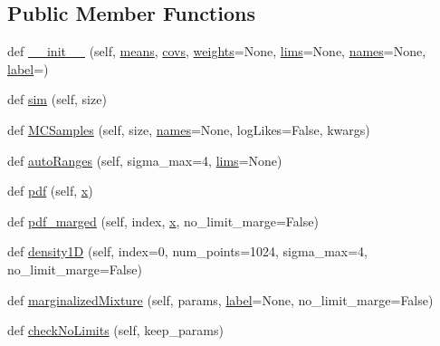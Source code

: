 \subsection*{Public Member Functions}
\begin{DoxyCompactItemize}
\item 
def \mbox{\hyperlink{classgetdist_1_1gaussian__mixtures_1_1MixtureND_ae08d46f0f7923a7dcb43eb540c8b9de6}{\+\_\+\+\_\+init\+\_\+\+\_\+}} (self, \mbox{\hyperlink{classgetdist_1_1gaussian__mixtures_1_1MixtureND_aeee57b3c06a515c91821b09866b52da3}{means}}, \mbox{\hyperlink{classgetdist_1_1gaussian__mixtures_1_1MixtureND_a51e91169ecb626b2ca59779abeed17b7}{covs}}, \mbox{\hyperlink{classgetdist_1_1gaussian__mixtures_1_1MixtureND_a7fbae73d771ec0e1ca1f80558ad3b08b}{weights}}=None, \mbox{\hyperlink{classgetdist_1_1gaussian__mixtures_1_1MixtureND_a0b9e4c4e0b3529e79cfa980507f8d2ea}{lims}}=None, \mbox{\hyperlink{classgetdist_1_1gaussian__mixtures_1_1MixtureND_ad26124d47b68d38fa8e90bc135769e6b}{names}}=None, \mbox{\hyperlink{classgetdist_1_1gaussian__mixtures_1_1MixtureND_aa9a7187396fe46246dc62e921c17302c}{label}}=\textquotesingle{}\textquotesingle{})
\item 
def \mbox{\hyperlink{classgetdist_1_1gaussian__mixtures_1_1MixtureND_a59cc8f909638f1b571279518b9285089}{sim}} (self, size)
\item 
def \mbox{\hyperlink{classgetdist_1_1gaussian__mixtures_1_1MixtureND_aa21545c325ae1162596655b4f4425acb}{M\+C\+Samples}} (self, size, \mbox{\hyperlink{classgetdist_1_1gaussian__mixtures_1_1MixtureND_ad26124d47b68d38fa8e90bc135769e6b}{names}}=None, log\+Likes=False, kwargs)
\item 
def \mbox{\hyperlink{classgetdist_1_1gaussian__mixtures_1_1MixtureND_aaa880a5a80583fb9f416e9fe9d99f25e}{auto\+Ranges}} (self, sigma\+\_\+max=4, \mbox{\hyperlink{classgetdist_1_1gaussian__mixtures_1_1MixtureND_a0b9e4c4e0b3529e79cfa980507f8d2ea}{lims}}=None)
\item 
def \mbox{\hyperlink{classgetdist_1_1gaussian__mixtures_1_1MixtureND_af0a646f4166c5e7183084e5fbea8b0b9}{pdf}} (self, \mbox{\hyperlink{plotTT_8m_a9336ebf25087d91c818ee6e9ec29f8c1}{x}})
\item 
def \mbox{\hyperlink{classgetdist_1_1gaussian__mixtures_1_1MixtureND_aa2ffcc1eb16586e772ea92dd662ba9e7}{pdf\+\_\+marged}} (self, index, \mbox{\hyperlink{plotTT_8m_a9336ebf25087d91c818ee6e9ec29f8c1}{x}}, no\+\_\+limit\+\_\+marge=False)
\item 
def \mbox{\hyperlink{classgetdist_1_1gaussian__mixtures_1_1MixtureND_a19dac60689b4c4e7772ffa807aad2dc0}{density1D}} (self, index=0, num\+\_\+points=1024, sigma\+\_\+max=4, no\+\_\+limit\+\_\+marge=False)
\item 
def \mbox{\hyperlink{classgetdist_1_1gaussian__mixtures_1_1MixtureND_a9336c58f7855163a171ea12a4d4bdbd1}{marginalized\+Mixture}} (self, params, \mbox{\hyperlink{classgetdist_1_1gaussian__mixtures_1_1MixtureND_aa9a7187396fe46246dc62e921c17302c}{label}}=None, no\+\_\+limit\+\_\+marge=False)
\item 
def \mbox{\hyperlink{classgetdist_1_1gaussian__mixtures_1_1MixtureND_a3878c180b2a99c4a7f257fea5a7a7d0f}{check\+No\+Limits}} (self, keep\+\_\+params)
\end{DoxyCompactItemize}
